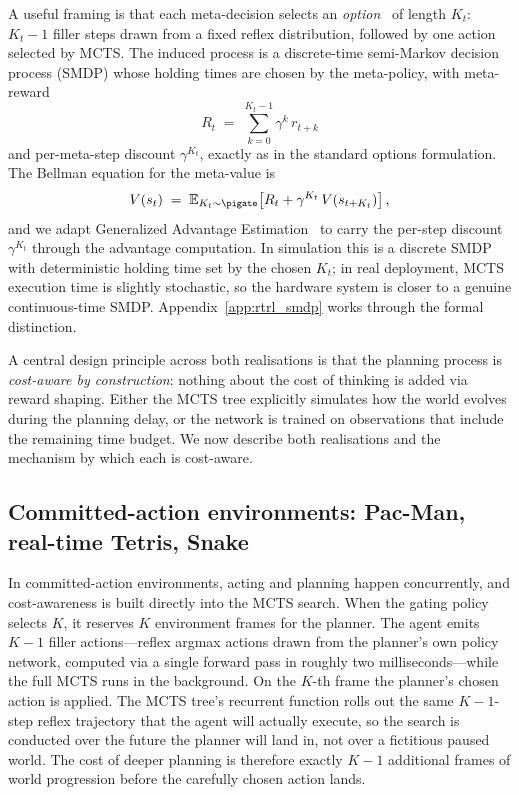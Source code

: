 A useful framing is that each meta-decision selects an
\emph{option}~\citep{sutton1999between,bacon2017optioncritic} of length
$K_t$: $K_t{-}1$ filler steps drawn from a fixed reflex distribution,
followed by one action selected by MCTS.
The induced process is a discrete-time semi-Markov decision process
(SMDP) whose holding times are chosen by the meta-policy, with
meta-reward
\begin{equation}
  R_t \;=\; \sum_{k=0}^{K_t - 1} \gamma^k \, r_{t+k}
\end{equation}
and per-meta-step discount $\gamma^{K_t}$, exactly as in the standard
options formulation.
The Bellman equation for the meta-value is
\begin{equation}
  V(s_t)
  \;=\;
  \mathbb{E}_{K_t \sim \pigate}\!\left[
    R_t + \gamma^{K_t}\, V(s_{t + K_t})
  \right],
  \label{eq:smdp}
\end{equation}
and we adapt Generalized Advantage Estimation~\citep{schulman2015high}
to carry the per-step discount $\gamma^{K_t}$ through the advantage
computation.
In simulation this is a discrete SMDP with deterministic holding time
set by the chosen $K_t$; in real deployment, MCTS execution time is
slightly stochastic, so the hardware system is closer to a genuine
continuous-time SMDP.
Appendix~\ref{app:rtrl_smdp} works through the formal distinction.

A central design principle across both realisations is that the
planning process is \emph{cost-aware by construction}: nothing about the
cost of thinking is added via reward shaping.
Either the MCTS tree explicitly simulates how the world evolves during
the planning delay, or the network is trained on observations that
include the remaining time budget.
We now describe both realisations and the mechanism by which each is
cost-aware.

\subsection{Committed-action environments: Pac-Man, real-time Tetris, Snake}

In committed-action environments, acting and planning happen
concurrently, and cost-awareness is built directly into the MCTS
search.
When the gating policy selects $K$, it reserves $K$ environment frames
for the planner.
The agent emits $K{-}1$ filler actions---reflex argmax actions drawn
from the planner's own policy network, computed via a single forward
pass in roughly two milliseconds---while the full MCTS runs in the
background.
On the $K$-th frame the planner's chosen action is applied.
The MCTS tree's recurrent function rolls out the same $K{-}1$-step
reflex trajectory that the agent will actually execute, so the search
is conducted over the future the planner will land in, not over a
fictitious paused world.
The cost of deeper planning is therefore exactly $K{-}1$ additional
frames of world progression before the carefully chosen action lands.

